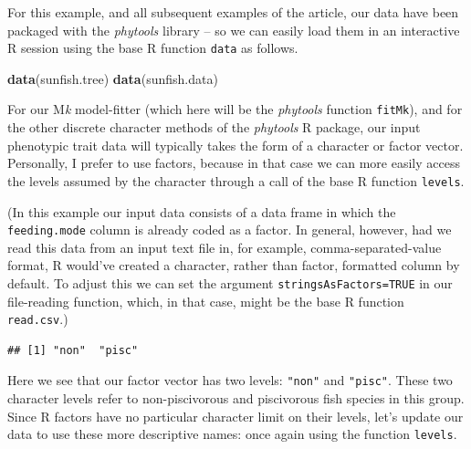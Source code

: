 \documentclass[fleqn,10pt,lineno]{wlpeerj} %
\newenvironment{Shaded}{\begin{snugshade}}{\end{snugshade}}
\newcommand{\FunctionTok}[1]{\textcolor[rgb]{0.13,0.29,0.53}{\textbf{#1}}}
\newcommand{\NormalTok}[1]{#1}
\newcommand{\OtherTok}[1]{\textcolor[rgb]{0.56,0.35,0.01}{#1}}
\newcommand{\SpecialCharTok}[1]{\textcolor[rgb]{0.81,0.36,0.00}{\textbf{#1}}}
\begin{document}
For this example, and all subsequent examples of the article, our data have been packaged with the \emph{phytools} library -- so we can easily load them in an interactive R session using the base R function \texttt{data} as follows.

\begin{Shaded}
\begin{Highlighting}[]
\FunctionTok{data}\NormalTok{(sunfish.tree)}
\FunctionTok{data}\NormalTok{(sunfish.data)}
\end{Highlighting}
\end{Shaded}

For our M\emph{k} model-fitter (which here will be the \emph{phytools} function \texttt{fitMk}), and for the other discrete character methods of the \emph{phytools} R package, our input phenotypic trait data will typically takes the form of a character or factor vector. Personally, I prefer to use factors, because in that case we can more easily access the levels assumed by the character through a call of the base R function \texttt{levels}.

(In this example our input data consists of a data frame in which the \texttt{feeding.mode} column is already coded as a factor. In general, however, had we read this data from an input text file in, for example, comma-separated-value format, R would've created a character, rather than factor, formatted column by default. To adjust this we can set the argument \texttt{stringsAsFactors=TRUE} in our file-reading function, which, in that case, might be the base R function \texttt{read.csv}.)

\begin{Shaded}
\end{Shaded}

\begin{verbatim}
## [1] "non"  "pisc"
\end{verbatim}

Here we see that our factor vector has two levels: \texttt{"non"} and \texttt{"pisc"}. These two character levels refer to non-piscivorous and piscivorous fish species in this group. Since R factors have no particular character limit on their levels, let's update our data to use these more descriptive names: once again using the function \texttt{levels}.
\end{document}

